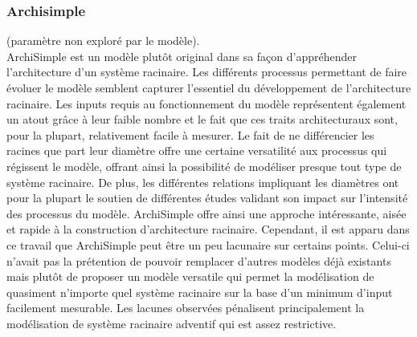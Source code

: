 \subsubsection{Archisimple }
\citep{pages_modelling_2014-1} (paramètre non exploré par le modèle). \\

ArchiSimple est un modèle plutôt original dans sa façon d'appréhender l'architecture d'un système racinaire.
Les différents processus permettant de faire évoluer le modèle semblent capturer l'essentiel du développement de l'architecture racinaire.
Les inputs requis au fonctionnement du modèle représentent également un atout grâce à leur faible nombre et le fait que ces traits architecturaux sont, pour la plupart, relativement facile à mesurer.
Le fait de ne différencier les racines que part leur diamètre offre une certaine versatilité aux processus qui régissent le modèle, offrant ainsi la possibilité de modéliser presque tout type de système racinaire.
De plus, les différentes relations impliquant les diamètres ont pour la plupart le soutien de différentes études validant son impact sur l'intensité des processus du modèle.
ArchiSimple offre ainsi une approche intéressante, aisée et rapide à la construction d'architecture racinaire.
Cependant, il est apparu dans ce travail que ArchiSimple peut être un peu lacunaire sur certains points.
Celui-ci n'avait pas la prétention de pouvoir remplacer d'autres modèles déjà existants mais plutôt de proposer un modèle versatile qui permet la modélisation de quasiment n'importe quel système racinaire sur la base d'un minimum d'input facilement mesurable.
Les lacunes observées pénalisent principalement la modélisation de système racinaire adventif qui est assez restrictive.
\newline

